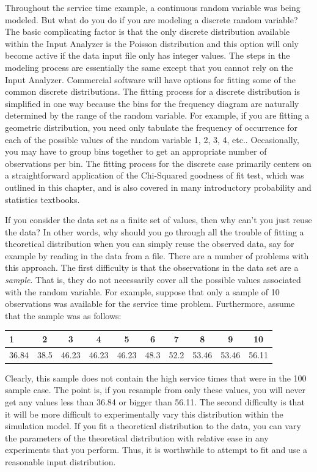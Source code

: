 \documentclass[
]{book}
\theoremstyle{definition}
\theoremstyle{definition}
\theoremstyle{definition}
\theoremstyle{definition}
\theoremstyle{remark}
\begin{document}
Throughout the service time example, a continuous random variable was
being modeled. But what do you do if you are modeling a discrete random
variable? The basic complicating factor is that the only discrete
distribution available within the Input Analyzer is the Poisson
distribution and this option will only become active if the data input
file only has integer values. The steps in the modeling process are
essentially the same except that you cannot rely on the Input Analyzer.
Commercial software will have options for fitting some of the common
discrete distributions. The fitting process for a discrete distribution
is simplified in one way because the bins for the frequency diagram are
naturally determined by the range of the random variable. For example,
if you are fitting a geometric distribution, you need only tabulate the
frequency of occurrence for each of the possible values of the random
variable 1, 2, 3, 4, etc.. Occasionally, you may have to group bins
together to get an appropriate number of observations per bin. The
fitting process for the discrete case primarily centers on a
straightforward application of the Chi-Squared goodness of fit test,
which was outlined in this chapter, and is also covered in many
introductory probability and statistics textbooks.

If you consider the data set as a finite set of values, then why can't
you just reuse the data? In other words, why should you go through all
the trouble of fitting a theoretical distribution when you can simply
reuse the observed data, say for example by reading in the data from a
file. There are a number of problems with this approach. The first
difficulty is that the observations in the data set are a \emph{sample}. That
is, they do not necessarily cover all the possible values associated
with the random variable. For example, suppose that only a sample of 10
observations was available for the service time problem. Furthermore,
assume that the sample was as follows:

\begin{longtable}[]{@{}lccccccccc@{}}
\toprule
1 & 2 & 3 & 4 & 5 & 6 & 7 & 8 & 9 & 10 \\
\midrule
\endhead
36.84 & 38.5 & 46.23 & 46.23 & 46.23 & 48.3 & 52.2 & 53.46 & 53.46 & 56.11 \\
\bottomrule
\end{longtable}

Clearly, this sample does not contain the high service times that were
in the 100 sample case. The point is, if you resample from only these
values, you will never get any values less than 36.84 or bigger than
56.11. The second difficulty is that it will be more difficult to
experimentally vary this distribution within the simulation model. If
you fit a theoretical distribution to the data, you can vary the
parameters of the theoretical distribution with relative ease in any
experiments that you perform. Thus, it is worthwhile to attempt to fit
and use a reasonable input distribution.
\end{document}
